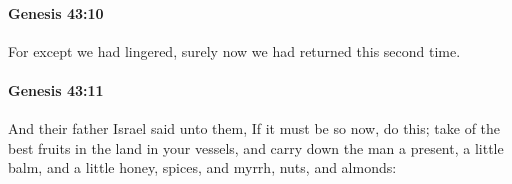 		\paragraph{Genesis 43:10} %
			\label{GENESIS-43-10}

			For except we had lingered, surely now we had returned this second time.


		\paragraph{Genesis 43:11} %
			\label{GENESIS-43-11}

			And their father Israel said unto them, If it must be so now, do this; take of the best fruits in the land in your vessels, and carry down the man a present, a little balm, and a little honey, spices, and myrrh, nuts, and almonds:


